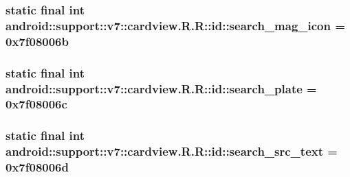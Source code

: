 \hypertarget{classandroid_1_1support_1_1v7_1_1cardview_1_1_r_1_1id_bb635eb1793bd8857226cd3682f21097}{
\subsubsection[{search\_\-mag\_\-icon}]{\setlength{\rightskip}{0pt plus 5cm}static final int android::support::v7::cardview.R.R::id::search\_\-mag\_\-icon = 0x7f08006b}}
\label{classandroid_1_1support_1_1v7_1_1cardview_1_1_r_1_1id_bb635eb1793bd8857226cd3682f21097}


\hypertarget{classandroid_1_1support_1_1v7_1_1cardview_1_1_r_1_1id_41dde8935259d539e700ab3c94dc6f18}{
\subsubsection[{search\_\-plate}]{\setlength{\rightskip}{0pt plus 5cm}static final int android::support::v7::cardview.R.R::id::search\_\-plate = 0x7f08006c}}
\label{classandroid_1_1support_1_1v7_1_1cardview_1_1_r_1_1id_41dde8935259d539e700ab3c94dc6f18}


\hypertarget{classandroid_1_1support_1_1v7_1_1cardview_1_1_r_1_1id_25f5f8d995e910219e56f1af14bb7fcc}{
\subsubsection[{search\_\-src\_\-text}]{\setlength{\rightskip}{0pt plus 5cm}static final int android::support::v7::cardview.R.R::id::search\_\-src\_\-text = 0x7f08006d}}
\label{classandroid_1_1support_1_1v7_1_1cardview_1_1_r_1_1id_25f5f8d995e910219e56f1af14bb7fcc}


